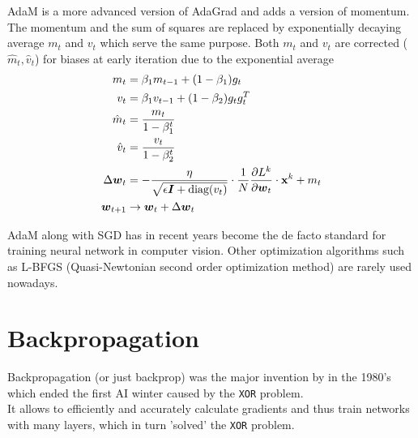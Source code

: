 AdaM is a more advanced version of AdaGrad and adds a version of momentum.
The momentum and the sum of squares are replaced by exponentially decaying average $m_t$ and $v_t$ which serve the same purpose.
Both $m_t$ and $v_t$ are corrected ($\hat{m}_t, \hat{v}_t$) for biases at early iteration due to the exponential average
\begin{align}
    m_t & = \beta_1 m_{t-1} + (1 - \beta_1) g_t \\
    v_t & = \beta_1 v_{t-1} + (1 - \beta_2) g_t g_t^T \\
    \hat{m}_t & = \frac{m_t}{1 - \beta_1^t} \\
    \hat{v}_t & = \frac{v_t}{1 - \beta_2^t} \\
    \Delta \boldsymbol{w}_t & = - \frac{\eta}{\sqrt{\epsilon \boldsymbol{I} + \text{diag}(v_t)}} \cdot \frac{1}{N} \frac{\partial L^k}{\partial \boldsymbol{w}_t} \cdot \mathbf{x}^k + m_t \\
    \boldsymbol{w}_{t+1} & \rightarrow \boldsymbol{w}_t + \Delta \boldsymbol{w}_t \\
\end{align}

AdaM along with SGD has in recent years become the de facto standard for training neural network in computer vision.
Other optimization algorithms such as L-BFGS (Quasi-Newtonian second order optimization method) are rarely used nowadays.




\section{Backpropagation}
Backpropagation (or just backprop) was the major invention by \citeauthor{backprop} in the 1980's which ended the first AI winter caused by the \lstinline|XOR| problem. \\
It allows to efficiently and accurately calculate gradients and thus train networks with many layers, which in turn 'solved' the \lstinline|XOR| problem.

